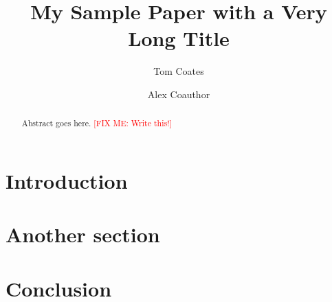 \documentclass[11pt,a4paper]{amsart}
\title[My Sample Paper] {My Sample Paper with a Very Long Title}
\author[Coates]{Tom Coates}
\author[Coauthor]{Alex Coauthor}
\newcommand{\fixme}[1]{\textcolor{red}{[FIX ME: #1]}}
\theoremstyle{plain}
\theoremstyle{definition}
\begin{document}
\begin{abstract}
	Abstract goes here. \fixme{Write this!}
\end{abstract}

\maketitle

\section{Introduction}

\section{Another section}

\section{Conclusion}




\end{document}

